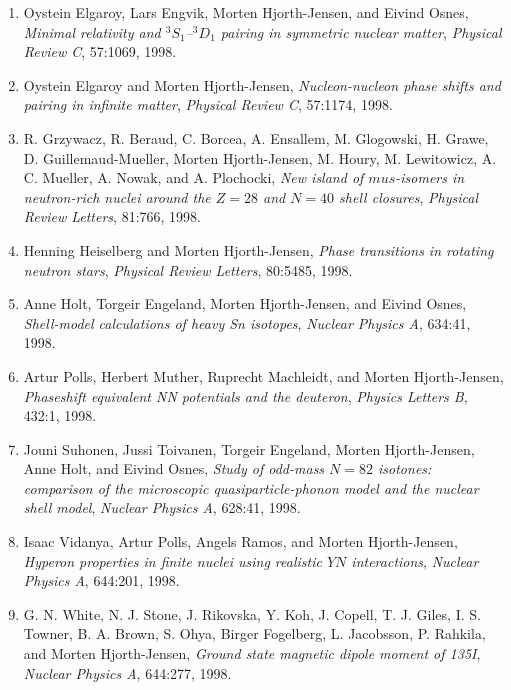 \documentclass[a4wide,10pt]{article}
\begin{document}
\begin{enumerate}
\item Oystein Elgaroy, Lars Engvik, Morten Hjorth-Jensen, and Eivind Osnes, \emph{Minimal relativity and $^3S_1$--$^3D_1$ pairing in symmetric   nuclear matter},  \emph{Physical Review C}, 57:1069, 1998. 

\item Oystein Elgaroy and Morten Hjorth-Jensen, \emph{Nucleon-nucleon phase shifts and pairing in infinite matter},  \emph{Physical Review C}, 57:1174, 1998. 

\item R. Grzywacz, R. Beraud, C. Borcea, A. Ensallem, M. Glogowski, H. Grawe,   D. Guillemaud-Mueller, Morten Hjorth-Jensen, M. Houry, M. Lewitowicz, A. C.   Mueller, A. Nowak, and A. Plochocki, \emph{New island of $mu s$-isomers in neutron-rich nuclei around the   $Z=28$ and $N=40$ shell closures}, \emph{Physical Review Letters}, 81:766, 1998. 

\item Henning Heiselberg and Morten Hjorth-Jensen, \emph{Phase transitions in rotating neutron stars},  \emph{Physical Review Letters}, 80:5485, 1998. 

\item Anne Holt, Torgeir Engeland, Morten Hjorth-Jensen, and Eivind Osnes, \emph{Shell-model calculations of heavy Sn isotopes},  \emph{Nuclear Physics A}, 634:41, 1998. 

\item Artur Polls, Herbert Muther, Ruprecht Machleidt, and Morten Hjorth-Jensen, \emph{Phaseshift equivalent NN potentials and the deuteron},  \emph{Physics Letters B}, 432:1, 1998. 

\item Jouni Suhonen, Jussi Toivanen, Torgeir Engeland, Morten Hjorth-Jensen, Anne   Holt, and Eivind Osnes, \emph{Study of odd-mass $N=82$ isotones: comparison of the microscopic   quasiparticle-phonon model and the nuclear shell model},  \emph{Nuclear Physics A}, 628:41, 1998. 

\item Isaac Vidanya, Artur Polls, Angels Ramos, and Morten Hjorth-Jensen, \emph{Hyperon properties in finite nuclei using realistic $YN$ interactions},  \emph{Nuclear Physics A}, 644:201, 1998. 

\item G. N. White, N. J. Stone, J. Rikovska, Y. Koh, J. Copell, T. J. Giles, I. S. Towner, B. A. Brown, S. Ohya, Birger Fogelberg, L. Jacobsson, P. Rahkila, and Morten Hjorth-Jensen, \emph{Ground state magnetic dipole moment of 135I},  \emph{Nuclear Physics A}, 644:277, 1998. 


\end{enumerate}
\end{document}
